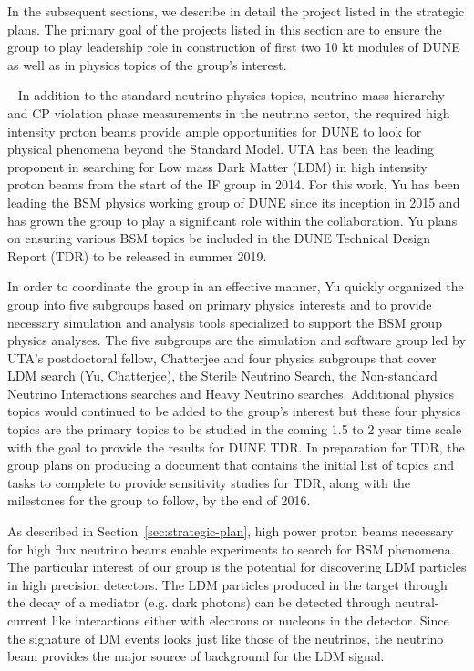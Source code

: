 In the subsequent sections, we describe in detail the project listed in the strategic plans.   The primary goal of the projects listed in this section are to ensure the group to play leadership role in construction of first two 10 kt modules of DUNE as well as in physics topics of the group's interest. 

%
%

%
%

%
%
~\label{sec:dune-bsm}
In addition to the standard neutrino physics topics, neutrino mass hierarchy and CP violation phase measurements in the neutrino sector, the required high intensity proton beams provide ample opportunities for DUNE to look for physical phenomena beyond the Standard Model. UTA has been the leading proponent in searching for Low mass Dark Matter (LDM) in high intensity proton beams from the start of the IF group in 2014. For this work, Yu has been leading the BSM physics working group of DUNE since its inception in 2015 and has grown the group to play a significant role within the collaboration. Yu plans on ensuring various BSM topics be included in the DUNE Technical Design Report (TDR) to be released in summer 2019.

In order to coordinate the group in an effective manner, Yu quickly organized the group into five subgroups based on primary physics interests and to provide necessary simulation and analysis tools specialized to support the BSM group physics analyses.
The five subgroups are the simulation and software group led by UTA's postdoctoral fellow, Chatterjee and four physics subgroups that cover LDM search (Yu, Chatterjee), the Sterile Neutrino Search, the Non-standard Neutrino Interactions searches and Heavy Neutrino searches. Additional physics topics would continued to be added to the group's interest but these four physics topics are the primary topics to be studied in the coming 1.5 to 2 year time scale with the goal to provide the results for DUNE TDR.
In preparation for TDR, the group plans on producing a document that contains the initial list of topics and tasks to complete to provide
sensitivity studies for TDR, along with the milestones for the group to follow, by the end of 2016. 

As described in Section~\ref{sec:strategic-plan}, high power proton beams necessary for high flux neutrino beams enable experiments to search for BSM phenomena.  The particular interest of our group is the potential for discovering LDM particles in high precision detectors. The LDM particles produced in the target through the decay of a mediator (e.g. dark photons) can be detected through neutral-current like interactions either with electrons or nucleons in the detector. Since the signature of DM events looks just like those of the neutrinos, the neutrino beam provides the major source of background for the LDM signal. 


